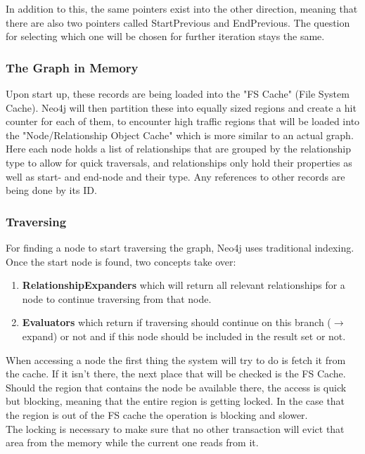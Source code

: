 In addition to this, the same pointers exist into the other direction, meaning that there are also two pointers called StartPrevious and EndPrevious. The question for selecting which one will be chosen for further iteration stays the same. \cite{NeoInternals}

\subsubsection{The Graph in Memory}
Upon start up, these records are being loaded into the "FS Cache" (File System Cache). Neo4j will then partition these into equally sized regions and create a hit counter for each of them, to encounter high traffic regions that will be loaded into the "Node/Relationship Object Cache" which is more similar to an actual graph. \cite{NeoInternals}\\
Here each node holds a list of relationships that are grouped by the relationship type to allow for quick traversals, and relationships only hold their properties as well as start- and end-node and their type. Any references to other records are being done by its ID. \cite{NeoInternals}

\subsubsection{Traversing}
For finding a node to start traversing the graph, Neo4j uses traditional indexing. \citep[minute 32]{NeoInternals} Once the start node is found, two concepts take over:
\begin{enumerate}
\item \textbf{RelationshipExpanders} which will return all relevant relationships for a node to continue traversing from that node.
\item \textbf{Evaluators} which return if traversing should continue on this branch ($ \rightarrow $ expand) or not and if this node should be included in the result set or not.
\end{enumerate}
When accessing a node the first thing the system will try to do is fetch it from the cache. If it isn't there, the next place that will be checked is the FS Cache. Should the region that contains the node be available there, the access is quick but blocking, meaning that the entire region is getting locked. In the case that the region is out of the FS cache the operation is blocking and slower. \\
The locking is necessary to make sure that no other transaction will evict that area from the memory while the current one reads from it. \cite{NeoInternals}

